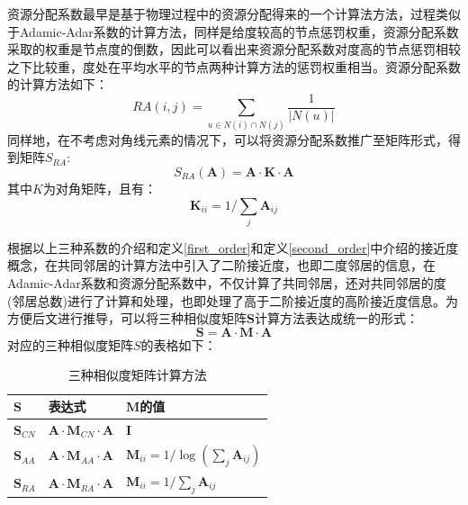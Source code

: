 资源分配系数最早是基于物理过程中的资源分配得来的一个计算法方法，过程类似于Adamic-Adar系数的计算方法，同样是给度较高的节点惩罚权重，资源分配系数采取的权重是节点度的倒数，因此可以看出来资源分配系数对度高的节点惩罚相较之下比较重，度处在平均水平的节点两种计算方法的惩罚权重相当。资源分配系数的计算方法如下：
\begin{equation}
	RA(i,j) =  \sum_{u \in N(i)\cap N(j)} \frac{1}{|N(u)|}
\end{equation}
同样地，在不考虑对角线元素的情况下，可以将资源分配系数推广至矩阵形式，得到矩阵$S_{RA}$:
\begin{equation}
	S_{RA}(\textbf{A}) = \textbf{A}\cdot \textbf{K} \cdot \textbf{A}
\end{equation}
其中$K$为对角矩阵，且有：
\begin{equation}
	\textbf{K}_{ii} = 1/\sum_j\textbf{A}_{ij}
\end{equation} 

根据以上三种系数的介绍和定义\ref{first_order}和定义\ref{second_order}中介绍的接近度概念，在共同邻居的计算方法中引入了二阶接近度，也即二度邻居的信息，在Adamic-Adar系数和资源分配系数中，不仅计算了共同邻居，还对共同邻居的度(邻居总数)进行了计算和处理，也即处理了高于二阶接近度的高阶接近度信息。为方便后文进行推导，可以将三种相似度矩阵$\textbf{S}$计算方法表达成统一的形式：
\begin{equation}\label{unify}
	\textbf{S} = \textbf{A} \cdot \textbf{M} \cdot \textbf{A}
\end{equation}
对应的三种相似度矩阵$S$的表格如下：
\begin{table}
	\centering
	\caption{三种相似度矩阵计算方法}
	\begin{tabular}{|C{1.0in}|C{1.8in}|C{1.8in}|}
		\hline
		$\textbf{S}$ & 表达式 & $\textbf{M}$的值  \\ \hline\hline
		$\textbf{S}_{CN}$ & $\textbf{A}\cdot \textbf{M}_{CN} \cdot\textbf{A}$ & $\textbf{I}$  \\ \hline
		$\textbf{S}_{AA}$ & $\textbf{A}\cdot \textbf{M}_{AA}\cdot \textbf{A}$ & $\textbf{M}_{ii} = 1/\log(\sum_j{\textbf{A}_{ij}})$ \\ \hline
		$\textbf{S}_{RA}$ & $\textbf{A}\cdot \textbf{M}_{RA}\cdot \textbf{A}$ & $\textbf{M}_{ii} = 1/\sum_j\textbf{A}_{ij}$ \\ \hline
	\end{tabular}
\end{table}

